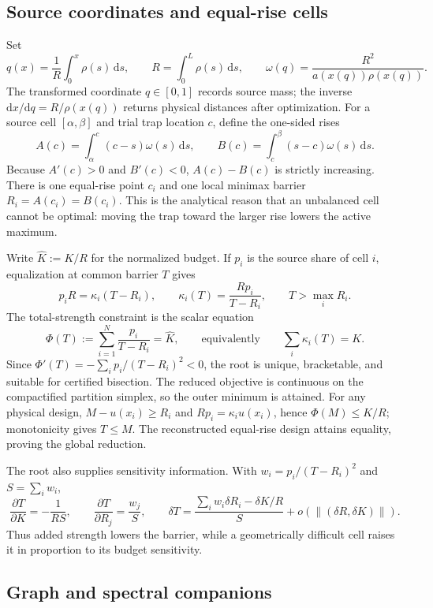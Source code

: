 \documentclass[10pt]{article}
\newcommand{\dd}{\,\mathrm d}
\begin{document}
\subsection{Source coordinates and equal-rise cells}

Set
\[
q(x)=\frac{1}{R}\int_0^x\rho(s)\dd s,
\qquad R=\int_0^L\rho(s)\dd s,
\qquad
\omega(q)=\frac{R^2}{a(x(q))\rho(x(q))}.
\]
The transformed coordinate $q\in[0,1]$ records source mass; the inverse $\mathrm dx/\mathrm dq=R/\rho(x(q))$ returns physical distances after optimization. For a source cell $[\alpha,\beta]$ and trial trap location $c$, define the one-sided rises
\[
A(c)=\int_\alpha^c(c-s)\omega(s)\dd s,
\qquad
B(c)=\int_c^\beta(s-c)\omega(s)\dd s.
\]
Because $A'(c)>0$ and $B'(c)<0$, $A(c)-B(c)$ is strictly increasing. There is one equal-rise point $c_i$ and one local minimax barrier $R_i=A(c_i)=B(c_i)$. This is the analytical reason that an unbalanced cell cannot be optimal: moving the trap toward the larger rise lowers the active maximum.

Write $\widehat K:=K/R$ for the normalized budget. If $p_i$ is the source share of cell $i$, equalization at common barrier $T$ gives
\[
p_iR=\kappa_i(T-R_i),
\qquad
\kappa_i(T)=\frac{Rp_i}{T-R_i},
\qquad T>\max_iR_i.
\]
The total-strength constraint is the scalar equation
\[
\Phi(T):=\sum_{i=1}^N\frac{p_i}{T-R_i}=\widehat K,
\qquad\text{equivalently}\qquad\sum_i\kappa_i(T)=K.
\]
Since $\Phi'(T)=-\sum_i p_i/(T-R_i)^2<0$, the root is unique, bracketable, and suitable for certified bisection. The reduced objective is continuous on the compactified partition simplex, so the outer minimum is attained. For any physical design, $M-u(x_i)\ge R_i$ and $Rp_i=\kappa_i u(x_i)$, hence $\Phi(M)\le K/R$; monotonicity gives $T\le M$. The reconstructed equal-rise design attains equality, proving the global reduction.

The root also supplies sensitivity information. With $w_i=p_i/(T-R_i)^2$ and $S=\sum_iw_i$,
\[
\frac{\partial T}{\partial K}=-\frac{1}{RS},
\qquad
\frac{\partial T}{\partial R_j}=\frac{w_j}{S},
\qquad
\delta T=\frac{\sum_iw_i\delta R_i-\delta K/R}{S}+o(\lVert(\delta R,\delta K)\rVert).
\]
Thus added strength lowers the barrier, while a geometrically difficult cell raises it in proportion to its budget sensitivity.

\subsection{Graph and spectral companions}
\end{document}
